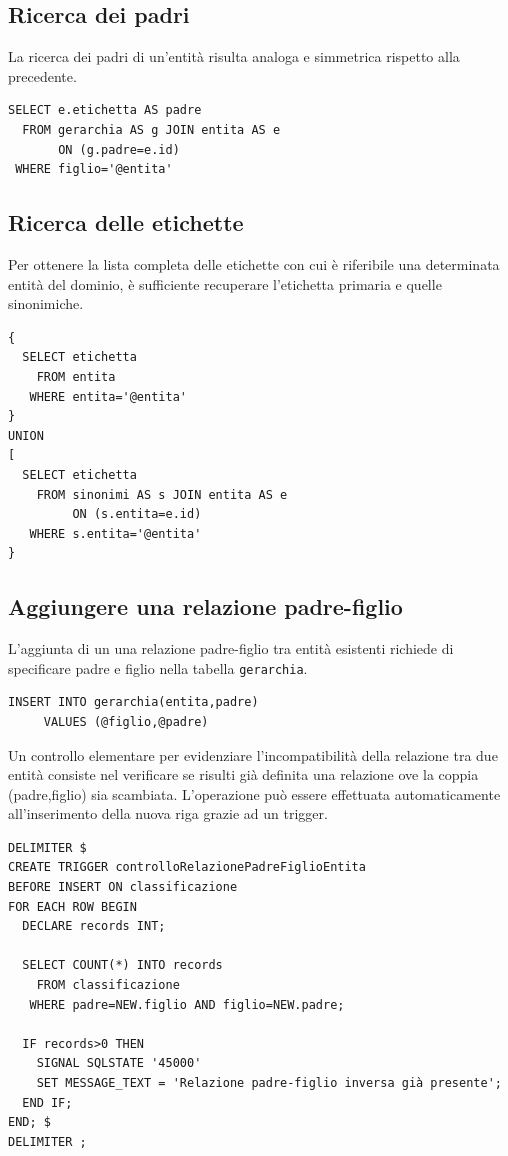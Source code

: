 \documentclass[10pt,a4paper,headinclude,footinclude,hidelinks]{scrreprt} %
\begin{document}
	\subsection{Ricerca dei padri}
	La ricerca dei padri di un'entità risulta analoga e simmetrica rispetto alla precedente.
\begin{verbatim}
SELECT e.etichetta AS padre
  FROM gerarchia AS g JOIN entita AS e
       ON (g.padre=e.id)
 WHERE figlio='@entita'
\end{verbatim}

	\subsection{Ricerca delle etichette}
	Per ottenere la lista completa delle etichette con cui è riferibile una determinata entità del dominio, è sufficiente recuperare l'etichetta primaria e quelle sinonimiche.

\begin{verbatim}
{
  SELECT etichetta
    FROM entita
   WHERE entita='@entita'
}
UNION
[
  SELECT etichetta
    FROM sinonimi AS s JOIN entita AS e
         ON (s.entita=e.id)
   WHERE s.entita='@entita'
}
\end{verbatim}

	\subsection{Aggiungere una relazione padre-figlio}
	L'aggiunta di un una relazione padre-figlio tra entità esistenti richiede di specificare padre e figlio nella tabella \texttt{gerarchia}.
\begin{verbatim}
INSERT INTO gerarchia(entita,padre)
     VALUES (@figlio,@padre)
\end{verbatim}

	Un controllo elementare per evidenziare l'incompatibilità della relazione tra due entità consiste nel verificare se risulti già definita una relazione ove la coppia (padre,figlio) sia scambiata. L'operazione può essere effettuata automaticamente all'inserimento della nuova riga grazie ad un trigger.
	
\begin{verbatim}
DELIMITER $
CREATE TRIGGER controlloRelazionePadreFiglioEntita
BEFORE INSERT ON classificazione
FOR EACH ROW BEGIN
  DECLARE records INT;

  SELECT COUNT(*) INTO records
    FROM classificazione
   WHERE padre=NEW.figlio AND figlio=NEW.padre;

  IF records>0 THEN
    SIGNAL SQLSTATE '45000'
    SET MESSAGE_TEXT = 'Relazione padre-figlio inversa già presente';
  END IF;
END; $
DELIMITER ;
\end{verbatim}
\end{document}

